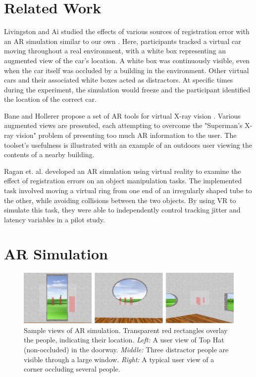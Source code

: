 \documentclass{acmsiggraph}                     %
\begin{document}
\section{Related Work}

Livingston and Ai studied the effects of various sources of registration error with an AR simulation similar to our own \cite{4637329}.  Here, participants tracked a virtual car moving throughout a real environment, with a white box representing an augmented view of the car's location.  A white box was continuously visible, even when the car itself was occluded by a building in the environment.  Other virtual cars and their associated white boxes acted as distractors.  At specific times during the experiment, the simulation would freeze and the participant identified the location of the correct car.

Bane and Hollerer propose a set of AR tools for virtual X-ray vision \cite{1383060}.  Various augmented views are presented, each attempting to overcome the "Superman's X-ray vision" problem of presenting too much AR information to the user.  The toolset's usefulness is illustrated with an example of an outdoors user viewing the contents of a nearby building.

Ragan et. al. \cite{4811058} developed an AR simulation using virtual reality to examine the effect of registration errors on an object manipulation tasks.  The implemented task involved moving a virtual ring from one end of an irregularly shaped tube to the other, while avoiding collisions between the two objects.  By using VR to simulate this task, they were able to independently control tracking jitter and latency variables in a pilot study.



\section{AR Simulation}

\begin{figure}[ht!]
	\centering
	\includegraphics[width=5in]{figures/triple_view.png}
	\caption{Sample views of AR simulation.  Transparent red rectangles overlay the people, indicating their location.  \emph{Left:} A user view of Top Hat (non-occluded) in the doorway.   \emph{Middle:} Three distractor people are visible through a large window.  \emph{Right:} A typical user view of a corner occluding several people.}
\end{figure}
\end{document}
